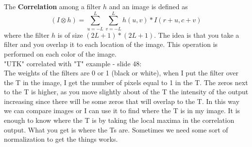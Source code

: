 The \textbf{Correlation} among a filter $h$ and an image is defined as 
$$
(I \otimes h)=\sum_{u=-L}^{L} \sum_{v=-L}^{L} h(u, v) * I(r+u, c+v)
$$
where the filter $h$ is of size $(2L+1) * (2L+1)$. 
The idea is that you take a filter and 
you overlap it 
to each location of the image. This operation is performed on each color of the image. \\
"UTK" correlated with "T" example - slide 48: \\
The weights of the filters are 0 or 1 (black or white), when I put the filter over the T in the image, I get the number of pixels equal to 1 in the T. The zeros next to the T is higher, as you move slightly about of the T the intensity of the output increasing since there will be some zeros that will overlap to the T. In this way we can compare images or I can use it to find where the T is in my image. It is enough to know where the T is by taking the local maxima in the correlation output. What you get is where the Ts are. Sometimes we need some sort of normalization to get the things works. 

